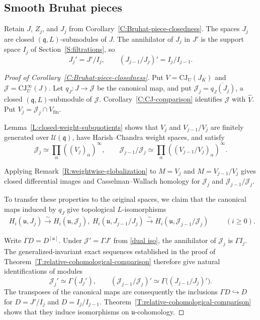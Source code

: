 \documentclass[a4paper,12pt]{amsart}
\numberwithin{equation}{section}
\theoremstyle{plain}
\theoremstyle{definition}
\theoremstyle{remark}
\begin{document}
\subsection{Smooth Bruhat pieces}\label{S:Bruhat-piece-closedness}

Retain $J$, $Z_j$, and $J_j$ from Corollary~\ref{C:Bruhat-piece-closedness}.
The spaces $J_j$ are closed $(\mathfrak q,L)$-submodules of $J$.
The annihilator of $J_j$ in $J'$ is the support space $I_j$ of Section~\ref{S:filtrations}, so
\[
 J_j'=J'/I_j,\qquad
 (J_{j-1}/J_j)'=I_j/I_{j-1}.
\]

\begin{proof}[Proof of Corollary~\ref{C:Bruhat-piece-closedness}]
Put $V=\mathrm{CJ}_U(J_K)$ and $\mathcal J=\mathrm{CJ}^{\infty}_U(J)$.
Let $q_J:J\to\mathcal J$ be the canonical map, and put $\mathcal J_j=\overline{q_J(J_j)}$, a closed $(\mathfrak q,L)$-submodule of $\mathcal J$.
Corollary~\ref{C:CJ-comparison} identifies $\mathcal J$ with $\widehat V$.
Put $V_j=\mathcal J_j\cap V_{\mathrm{fin}}$.

Lemma~\ref{L:closed-weight-subquotients} shows that $V_j$ and $V_{j-1}/V_j$ are finitely generated over $\mathcal U(\mathfrak q)$, have Harish--Chandra weight spaces, and satisfy
\[
 \mathcal J_j\simeq\prod_\alpha((V_j)_\alpha)^\infty,
 \qquad
 \mathcal J_{j-1}/\mathcal J_j
 \simeq\prod_\alpha((V_{j-1}/V_j)_\alpha)^\infty.
\]

Applying Remark~\ref{R:weightwise-globalization} to $M=V_j$ and $M=V_{j-1}/V_j$ gives closed differential images and Casselman--Wallach homology for $\mathcal J_j$ and $\mathcal J_{j-1}/\mathcal J_j$.

To transfer these properties to the original spaces, we claim that the canonical maps induced by $q_J$ give topological $L$-isomorphisms
\begin{equation}\label{Eq:Bruhat-piece-homology-comparison}
 \begin{aligned}
 H_i(\mathfrak u,J_j)\xrightarrow{\ \sim\ }H_i(\mathfrak u,\mathcal J_j),\ 
 H_i(\mathfrak u,J_{j-1}/J_j)\xrightarrow{\ \sim\ }
 H_i(\mathfrak u,\mathcal J_{j-1}/\mathcal J_j)
 \end{aligned}
 \qquad(i\geq0).
\end{equation}

Write $\Gamma D=D^{[\mathfrak u]}$.
Under $\mathcal J'=\Gamma J'$ from \eqref{dual iso}, the annihilator of $\mathcal J_j$ is $\Gamma I_j$.
The generalized-invariant exact sequences established in the proof of Theorem~\ref{T:relative-cohomological-comparison} therefore give natural identifications of modules
\[
 \mathcal J_j'\simeq\Gamma(J_j'),
 \qquad
 (\mathcal J_{j-1}/\mathcal J_j)'
 \simeq\Gamma\bigl((J_{j-1}/J_j)'\bigr).
\]
The transposes of the canonical maps are consequently the inclusions $\Gamma D\hookrightarrow D$ for $D=J'/I_j$ and $D=I_j/I_{j-1}$.
Theorem~\ref{T:relative-cohomological-comparison} shows that they induce isomorphisms on $\mathfrak u$-cohomology.


\end{proof}
\end{document}
